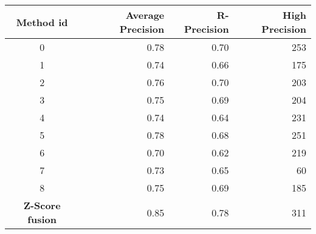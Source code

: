 \begin{table}[H]
  \label{tab:9rl_results_st_jean_A_B}
  \begin{tabular}{c r r r}
    \toprule
    Method id &
    Average Precision &
    R-Precision &
    High Precision \\
    \midrule
    0 & 0.78 & 0.70 & 253 \\
    1 & 0.74 & 0.66 & 175 \\
    2 & 0.76 & 0.70 & 203 \\
    3 & 0.75 & 0.69 & 204 \\
    4 & 0.74 & 0.64 & 231 \\
    5 & 0.78 & 0.68 & 251 \\
    6 & 0.70 & 0.62 & 219 \\
    7 & 0.73 & 0.65 &  60 \\
    8 & 0.75 & 0.69 & 185 \\
    \textbf{Z-Score fusion} & 0.85 & 0.78 & 311 \\
    \bottomrule
  \end{tabular}

\end{table}
